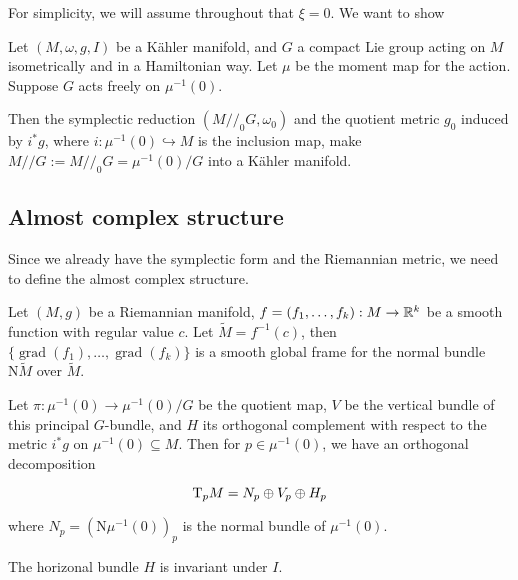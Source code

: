 \documentclass{article}
\newcommand{\sslash}{/\!/}
\newcommand{\NN}{\mathrm{N}}
\DeclareMathOperator{\gr}{grad}
\begin{document}
For simplicity, we will assume throughout that \(\xi = 0\). We want to show

\begin{theorem}
    Let \((M, \omega, g, I)\) be a K\"ahler manifold, and \(G\) a compact Lie group acting on \(M\) isometrically and in a Hamiltonian way. Let \(\mu\) be the moment map for the action. Suppose \(G\) acts freely on \(\mu^{-1}(0)\).

    Then the symplectic reduction \((M\sslash_0 G, \omega_0)\) and the quotient metric \(g_0\) induced by \(i^*g\), where \(i : \mu^{-1}(0) \hookrightarrow M\) is the inclusion map, make \(M\sslash G := M\sslash_0 G = \mu^{-1}(0)/G\) into a K\"ahler manifold.
\end{theorem}

\subsection{Almost complex structure}

Since we already have the symplectic form and the Riemannian metric, we need to define the almost complex structure.

\begin{lemma}
    Let \((M, g)\) be a Riemannian manifold, \(f = (f_1, \dots, f_k) : M \to \mathbb{R}^k\) be a smooth function with regular value \(c\). Let \(\tilde M = f^{-1}(c)\), then \(\{\gr(f_1), \dots, \gr(f_k)\}\) is a smooth global frame for the normal bundle \(\NN \tilde M\) over \(\tilde M\).
\end{lemma}

Let \(\pi : \mu^{-1}(0) \to \mu^{-1}(0)/G\) be the quotient map, \(V\) be the vertical bundle of this principal \(G\)-bundle, and \(H\) its orthogonal complement with respect to the metric \(i^*g\) on \(\mu^{-1}(0) \subseteq M\). Then for \(p \in \mu^{-1}(0)\), we have an orthogonal decomposition

\[\mathrm{T}_p M = N_p \oplus V_p \oplus H_p\]

where \(N_p = (\NN \mu^{-1}(0))_p\) is the normal bundle of \(\mu^{-1}(0)\).

\begin{lemma}
    The horizonal bundle \(H\) is invariant under \(I\).
\end{lemma}
\end{document}
